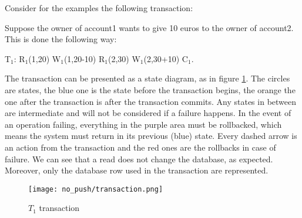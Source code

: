 Consider for the examples the following transaction:

Suppose the owner of account1 wants to give 10 euros to the owner of account2. This is done the following way:

T$_{\text{1}}$: R$_{\text{1}}$(1,20) W$_{\text{1}}$(1,20-10) R$_{\text{1}}$(2,30) W$_{\text{1}}$(2,30+10) C$_{\text{1}}$.

The transaction can be presented as a state diagram, as in figure \ref{fig:transaction}. The circles are states, the blue one is the state before the transaction begins, the orange the one after the transaction is after the transaction commits. Any states in between are intermediate and will not be considered if a failure happens. In the event of an operation failing, everything in the purple area must be rollbacked, which means the system must return in its previous (blue) state. Every dashed arrow is an action from the transaction and the red ones are the rollbacks in case of failure. We can see that a read does not change the database, as expected. Moreover, only the database row used in the transaction are represented.


\begin{figure}[H]
  \vspace{-10pt}
  \centering
  \centerline{\texttt{[image: no\_push/transaction.png]}}
  \vspace{-5pt}
  \caption{$T_1$ transaction}
  \vspace{-5pt}
  \label{fig:transaction}
\end{figure}

